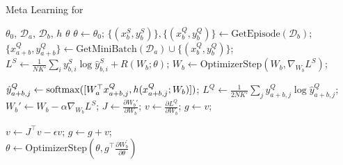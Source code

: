 \iflatexml
\begin{algorithm}
\caption{Meta Learning for {\ourproblem}}
\label{alg:energy}
\begin{algorithmic}[1]
\REQUIRE $\theta_0$, $\mathcal{D}_a$, $\mathcal{D}_b$, $h$
\ENSURE $\theta$
\STATE $\theta \gets \theta_0$;
\STATE $\{(x_b^S, y_b^S)\}, \{(x_b^Q,y_b^Q)\} \gets \text{GetEpisode}(\mathcal{D}_b)$;
\STATE $\{x_{a+b}^Q, y_{a+b}^Q\} \gets \text{GetMiniBatch}(\mathcal{D}_a) \cup \{(x_b^Q, y_b^Q)\}$;
\STATE $ $
\REPEAT
    \STATE $L^S \gets \frac{1}{NK'} \sum_i y_{b,i}^S \log \hat{y}_{b,i}^S + R(W_b; \theta)$;
    \STATE $W_b \gets \text{OptimizerStep}(W_b, \nabla_{W_b} L^S)$;

\STATE $\hat{y}_{a+b,j}^Q \gets \mathrm{softmax}([W_a^\top x_{a+b, j}^Q, h( x_{a+b, j}^Q;W_b) ])$;
\STATE $L^Q \gets \frac{1}{2NK'} \sum_j y_{a+b,j}^Q \log \hat{y}_{a+b,j}^Q$;
\STATE {}
\STATE {}
\STATE $W_b' \gets W_b - \alpha \nabla_{W_b} L^S$;%
\STATE $J \gets \frac{\partial W_b'}{\partial W_b}$; $v \gets \frac{\partial L^Q}{\partial W_b}$; $g \gets v$;

\REPEAT
\STATE $v \gets J^\top v - \epsilon v$; $g \gets g + v$;
\STATE ~\\
\STATE $\theta \gets \text{OptimizerStep}(\theta, g^\top \frac{\partial W_b^{\prime}}{\partial \theta})$
\ENDFOR
\end{algorithmic}
\end{algorithm}
\else
